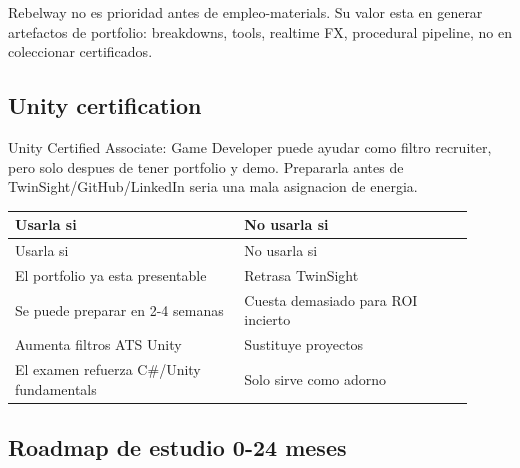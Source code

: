 Rebelway no es prioridad antes de empleo-materials. Su valor esta en generar artefactos de portfolio: breakdowns, tools, realtime FX, procedural pipeline, no en coleccionar certificados.


\subsection{Unity certification}


Unity Certified Associate: Game Developer puede ayudar como filtro recruiter, pero solo despues de tener portfolio y demo. Prepararla antes de TwinSight/GitHub/LinkedIn seria una mala asignacion de energia.


\begin{center}
\scriptsize
\begin{longtable}{>{\raggedright\arraybackslash}p{0.455\linewidth} >{\raggedright\arraybackslash}p{0.455\linewidth}}
\toprule
Usarla si & No usarla si \\
\midrule
\endfirsthead
\toprule
Usarla si & No usarla si \\
\midrule
\endhead
El portfolio ya esta presentable & Retrasa TwinSight \\
Se puede preparar en 2-4 semanas & Cuesta demasiado para ROI incierto \\
Aumenta filtros ATS Unity & Sustituye proyectos \\
El examen refuerza C\#/Unity fundamentals & Solo sirve como adorno \\
\bottomrule
\end{longtable}
\end{center}


\subsection{Roadmap de estudio 0-24 meses}


